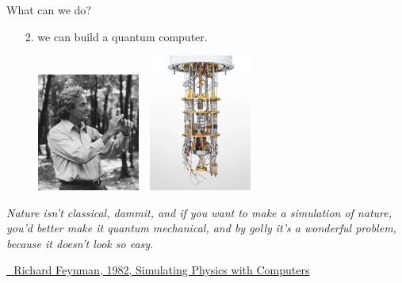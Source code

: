 \documentclass[aspectratio=169, 10pt, xcolor={svgnames}, hyperref={linkcolor=black}]{beamer}
\begin{document}
\begin{frame}{What can we do?}
\pause
\begin{itemize}[noitemsep]
\pause
\item[2.] we can build a quantum computer.
\end{itemize}
\pause
\begin{figure}
   \includegraphics[width=0.3\textwidth, height=0.55\textheight]{figures/feynmann.jpg}%
   $\,\,$ \pause
   \includegraphics[width=0.3\textwidth, height=0.55\textheight]{figures/qcomp.png}
\end{figure}

\small{ \textit{Nature isn't classical, dammit, and if you want to make a simulation of nature,
you'd better make it quantum mechanical, and by golly it's a wonderful problem,
because it doesn't look so easy.} }

\href{https://link.springer.com/article/10.1007/BF02650179}{\faBook\,\, Richard Feynman, 1982, Simulating Physics with Computers}
\end{frame}
\end{document}
